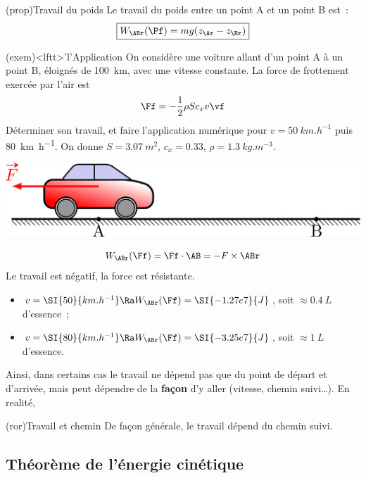 \documentclass[../../main/main.tex]{subfiles}
\begin{document}
\begin{tcb*}(prop){Travail du poids}
	Le travail du poids entre un point A et un point B est~:
	\[\boxed{W_\ABr(\Pf) = mg(z_\Ar - z_\Br)}\]
\end{tcb*}

\begin{tcb*}(exem)<lftt>'l'{Application}
	On considère une voiture allant d'un point A à un point B, éloignés de
	\SI{100}{km}, avec une vitesse constante. La force de frottement exercée par
	l'air est
	\[\Ff = -\frac{1}{2}\rho Sc_xv\vf\]
	Déterminer son travail, et faire l'application
	numérique pour $v = \SI{50}{km.h^{-1}}$ puis \SI{80}{km.h^{-1}}. On donne $S
		= \SI{3.07}{m^2}$, $c_x = \num{0.33}$, $\rho = \SI{1.3}{kg.m^{-3}}$.
	\tcblower
	\begin{minipage}{0.45\linewidth}
		\begin{center}
			\includegraphics[width=\linewidth]{voiture}
		\end{center}
	\end{minipage}
	\hfill
	\begin{minipage}{0.45\linewidth}
		\[W_{\ABr}(\Ff) = \Ff\cdot\AB = -F\times\ABr\]
		Le travail est négatif, la force est résistante.
		\begin{itemize}
			\item $v = \SI{50}{km.h^{-1}} \Ra W_{\ABr}(\Ff) = \SI{-1.27e7}{J}$,
			      soit $\approx \SI{0.4}{L}$ d'essence~;
			\item $v = \SI{80}{km.h^{-1}} \Ra W_{\ABr}(\Ff) = \SI{-3.25e7}{J}$,
			      soit $\approx \SI{1}{L}$ d'essence.
		\end{itemize}
	\end{minipage}
\end{tcb*}

Ainsi, dans certains cas le travail ne dépend pas que du point de départ et
d'arrivée, mais peut dépendre de la \textbf{façon} d'y aller (vitesse, chemin
suivi…). En realité,
\begin{tcb*}[cnt](ror){Travail et chemin}
	De façon générale, le travail dépend du chemin suivi.
\end{tcb*}

\subsection{Théorème de l'énergie cinétique}
\end{document}
